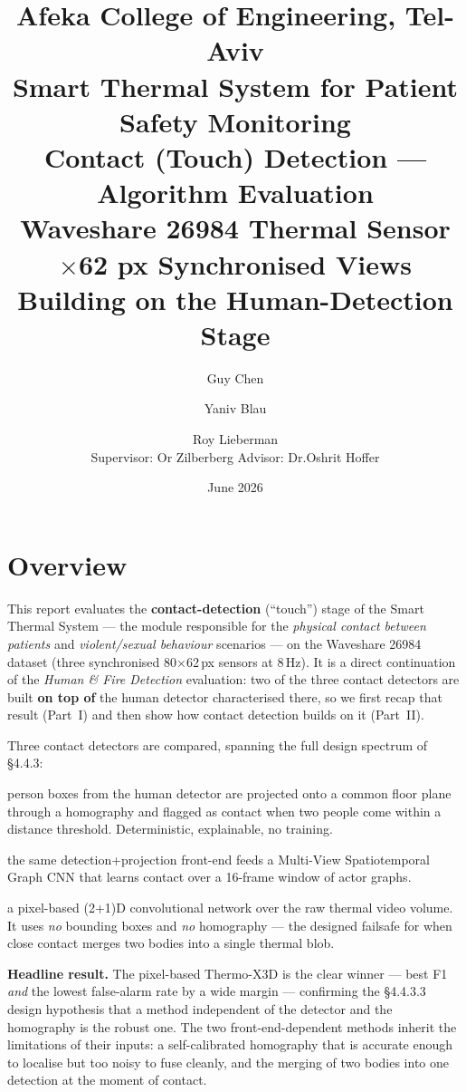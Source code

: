 \documentclass[11pt, a4paper]{article}
\title{%
    {\large Afeka College of Engineering, Tel-Aviv}\\[0.4em]
    {\large Smart Thermal System for Patient Safety Monitoring}\\[0.8em]
    {\LARGE\bfseries Contact (Touch) Detection — Algorithm Evaluation}\\[0.4em]
    {\normalsize Waveshare 26984 Thermal Sensor \quad 80$\times$62 px \quad
     3 Synchronised Views \quad Building on the Human-Detection Stage}
}
\author{%
    Guy Chen \and Yaniv Blau \and Roy Lieberman\\[0.3em]
    \small Supervisor: Or Zilberberg \qquad Advisor: Dr.\@ Oshrit Hoffer
}
\date{June 2026}
\begin{document}
\maketitle
\tableofcontents
\newpage

\section{Overview}

This report evaluates the \textbf{contact-detection} (``touch'') stage of the
Smart Thermal System --- the module responsible for the \emph{physical contact
between patients} and \emph{violent/sexual behaviour} scenarios --- on the
Waveshare 26984 dataset (three synchronised 80$\times$62\,px sensors at 8\,Hz).
It is a direct continuation of the \emph{Human \& Fire Detection} evaluation:
two of the three contact detectors are built \textbf{on top of} the human
detector characterised there, so we first recap that result (Part~I) and then
show how contact detection builds on it (Part~II).

Three contact detectors are compared, spanning the full design spectrum of
\S4.4.3:

\begin{description}[leftmargin=2em, style=nextline]
    \item[Geometric multi-view (\S4.4.3.1):] person boxes from the human
        detector are projected onto a common floor plane through a homography
        and flagged as contact when two people come within a distance
        threshold. Deterministic, explainable, no training.
    \item[MV-STGCN (\S4.4.3.2):] the same detection+projection front-end feeds
        a Multi-View Spatiotemporal Graph CNN that learns contact over a
        16-frame window of actor graphs.
    \item[Thermo-X3D (\S4.4.3.3):] a pixel-based (2+1)D convolutional network
        over the raw thermal video volume. It uses \emph{no} bounding boxes and
        \emph{no} homography --- the designed failsafe for when close contact
        merges two bodies into a single thermal blob.
\end{description}

\textbf{Headline result.} The pixel-based Thermo-X3D is the clear winner ---
best F1 \emph{and} the lowest false-alarm rate by a wide margin --- confirming
the \S4.4.3.3 design hypothesis that a method independent of the detector and
the homography is the robust one. The two front-end-dependent methods inherit
the limitations of their inputs: a self-calibrated homography that is accurate
enough to localise but too noisy to fuse cleanly, and the merging of two
bodies into one detection at the moment of contact.
\end{document}
